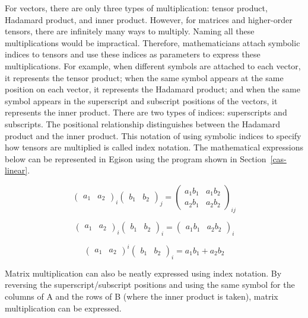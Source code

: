 For vectors, there are only three types of multiplication: tensor product, Hadamard product, and inner product. However, for matrices and higher-order tensors, there are infinitely many ways to multiply.
Naming all these multiplications would be impractical.
Therefore, mathematicians attach symbolic indices to tensors and use these indices as parameters to express these multiplications.
For example, when different symbols are attached to each vector, it represents the tensor product; when the same symbol appears at the same position on each vector, it represents the Hadamard product; and when the same symbol appears in the superscript and subscript positions of the vectors, it represents the inner product.
There are two types of indices: superscripts and subscripts.
The positional relationship distinguishes between the Hadamard product and the inner product.
This notation of using symbolic indices to specify how tensors are multiplied is called index notation.
The mathematical expressions below can be represented in Egison using the program shown in Section~\ref{cas-linear}.

$$
\begin{pmatrix}
a_{1} & a_{2}
\end{pmatrix}_{i}
\begin{pmatrix}
b_{1} & b_{2}
\end{pmatrix}_{j}
=
\begin{pmatrix}
a_{1} b_{1} & a_{1} b_{2} \\
a_{2} b_{1} & a_{2} b_{2}
\end{pmatrix}_{ij}
$$

$$
\begin{pmatrix}
a_{1} & a_{2}
\end{pmatrix}_{i}
\begin{pmatrix}
b_{1} & b_{2}
\end{pmatrix}_{i}
=
\begin{pmatrix}
a_{1} b_{1} & a_{2} b_{2}
\end{pmatrix}_{i}
$$

$$
\begin{pmatrix}
a_{1} & a_{2}
\end{pmatrix}^{i}
\begin{pmatrix}
b_{1} & b_{2}
\end{pmatrix}_{i}
=
a_{1} b_{1} + a_{2} b_{2}
$$

Matrix multiplication can also be neatly expressed using index notation.
By reversing the superscript/subscript positions and using the same symbol for the columns of A and the rows of B (where the inner product is taken), matrix multiplication can be expressed.

